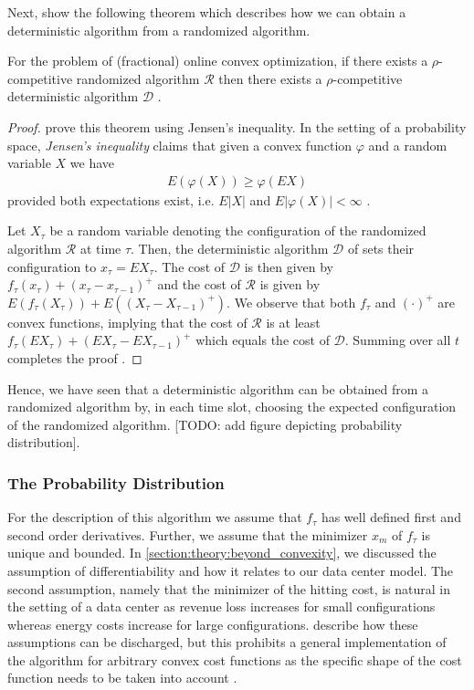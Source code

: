 Next, \citeauthor*{Bansal2015} show the following theorem which describes how we can obtain a deterministic algorithm from a randomized algorithm. \begin{theorem}
    For the problem of (fractional) online convex optimization, if there exists a $\rho$-competitive randomized algorithm $\mathcal{R}$ then there exists a $\rho$-competitive deterministic algorithm $\mathcal{D}$ \cite{Bansal2015}.
\end{theorem}
\begin{proof}
\citeauthor*{Bansal2015} prove this theorem using Jensen's inequality. In the setting of a probability space, \textit{Jensen's inequality} claims that given a convex function $\varphi$ and a random variable $X$ we have \begin{align}
    E(\varphi(X)) \geq \varphi(E X)
\end{align} provided both expectations exist, i.e. $E |X|$ and $E |\varphi(X)| < \infty$ \cite{Durrett2010}.

Let $X_{\tau}$ be a random variable denoting the configuration of the randomized algorithm $\mathcal{R}$ at time $\tau$. Then, the deterministic algorithm $\mathcal{D}$ of \citeauthor*{Bansal2015} sets their configuration to $x_{\tau} = E X_{\tau}$. The cost of $\mathcal{D}$ is then given by $f_{\tau}(x_{\tau}) + (x_{\tau} - x_{\tau-1})^+$ and the cost of $\mathcal{R}$ is given by $E(f_{\tau}(X_{\tau})) + E((X_{\tau} - X_{\tau-1})^+)$. We observe that both $f_{\tau}$ and $(\cdot)^+$ are convex functions, implying that the cost of $\mathcal{R}$ is at least $f_{\tau}(E X_{\tau}) + (E X_{\tau} - E X_{\tau-1})^+$ which equals the cost of $\mathcal{D}$. Summing over all $t$ completes the proof \cite{Bansal2015}.
\end{proof}

Hence, we have seen that a deterministic algorithm can be obtained from a randomized algorithm by, in each time slot, choosing the expected configuration of the randomized algorithm. [TODO: add figure depicting probability distribution].

\subsubsection{The Probability Distribution}

For the description of this algorithm we assume that $f_{\tau}$ has well defined first and second order derivatives. Further, we assume that the minimizer $x_m$ of $f_{\tau}$ is unique and bounded. In \autoref{section:theory:beyond_convexity}, we discussed the assumption of differentiability and how it relates to our data center model. The second assumption, namely that the minimizer of the hitting cost, is natural in the setting of a data center as revenue loss increases for small configurations whereas energy costs increase for large configurations. \citeauthor*{Bansal2015} describe how these assumptions can be discharged, but this prohibits a general implementation of the algorithm for arbitrary convex cost functions as the specific shape of the cost function needs to be taken into account \cite{Bansal2015}.

